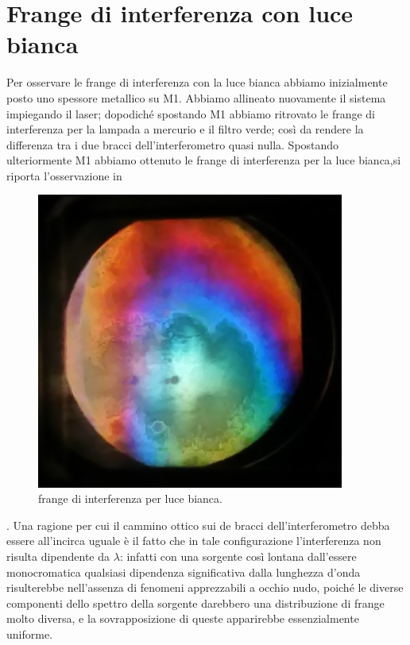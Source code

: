 \section{Frange di interferenza con luce bianca}
Per osservare le frange di interferenza con la luce bianca
abbiamo inizialmente posto uno spessore metallico su M1.
Abbiamo allineato nuovamente il sistema impiegando il laser;
dopodiché spostando M1 abbiamo ritrovato le frange di interferenza
per la lampada a mercurio e il filtro verde; così da rendere 
la differenza tra i due bracci dell'interferometro quasi nulla.
Spostando ulteriormente M1 abbiamo ottenuto le frange di interferenza per
la luce bianca,si riporta l'osservazione in 
\bigskip
\begin{figure} [!h]
	\centering
	\includegraphics[width=0.9\textwidth]{./pictures/frange.jpg}
	\caption{frange di interferenza per luce bianca.}
	\label{fig:frangeb}
\end{figure}
\bigskip
{}.
Una ragione per cui il cammino ottico sui
de bracci dell'interferometro debba essere all'incirca uguale è
 il fatto che in tale configurazione l'interferenza non risulta
dipendente da $\lambda$: infatti con una sorgente così lontana
dall'essere monocromatica qualsiasi dipendenza significativa dalla
lunghezza d'onda risulterebbe nell'assenza di fenomeni apprezzabili a occhio nudo,
poiché le diverse componenti dello spettro della sorgente darebbero una distribuzione di frange
molto diversa, e la sovrapposizione di queste apparirebbe essenzialmente uniforme.